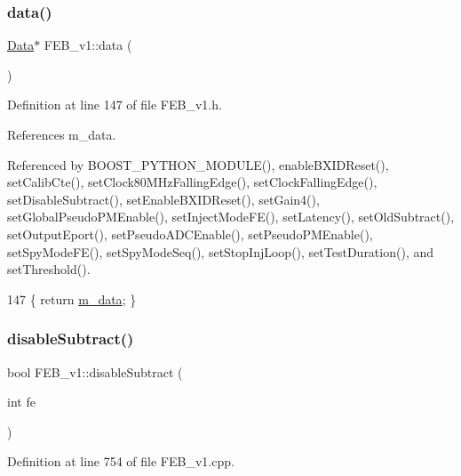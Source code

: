 \subsubsection{\texorpdfstring{data()}{data()}}
{\footnotesize\ttfamily \hyperlink{classData}{Data}$\ast$ F\+E\+B\+\_\+v1\+::data (\begin{DoxyParamCaption}{ }\end{DoxyParamCaption})\hspace{0.3cm}{\ttfamily [inline]}}



Definition at line 147 of file F\+E\+B\+\_\+v1.\+h.



References m\+\_\+data.



Referenced by B\+O\+O\+S\+T\+\_\+\+P\+Y\+T\+H\+O\+N\+\_\+\+M\+O\+D\+U\+L\+E(), enable\+B\+X\+I\+D\+Reset(), set\+Calib\+Cte(), set\+Clock80\+M\+Hz\+Falling\+Edge(), set\+Clock\+Falling\+Edge(), set\+Disable\+Subtract(), set\+Enable\+B\+X\+I\+D\+Reset(), set\+Gain4(), set\+Global\+Pseudo\+P\+M\+Enable(), set\+Inject\+Mode\+F\+E(), set\+Latency(), set\+Old\+Subtract(), set\+Output\+Eport(), set\+Pseudo\+A\+D\+C\+Enable(), set\+Pseudo\+P\+M\+Enable(), set\+Spy\+Mode\+F\+E(), set\+Spy\+Mode\+Seq(), set\+Stop\+Inj\+Loop(), set\+Test\+Duration(), and set\+Threshold().


\begin{DoxyCode}
147 \{ \textcolor{keywordflow}{return} \hyperlink{classFEB__v1_a1c9dbc3660021dba1f58666d0097abb0}{m\_data}; \}
\end{DoxyCode}
\mbox{\label{classFEB__v1_a3d224acca0807603d14b72cff6359b3f}} 
\subsubsection{\texorpdfstring{disable\+Subtract()}{disableSubtract()}}
{\footnotesize\ttfamily bool F\+E\+B\+\_\+v1\+::disable\+Subtract (\begin{DoxyParamCaption}\item[{int}]{fe }\end{DoxyParamCaption})}



Definition at line 754 of file F\+E\+B\+\_\+v1.\+cpp.




